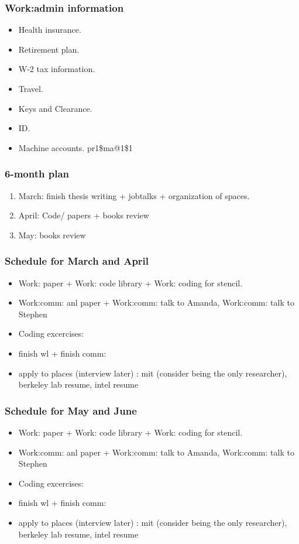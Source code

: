 \begin{frame} 
\frametitle{Work:admin information}

\begin{itemize} 
\item Health insurance.
\item Retirement plan.
\item W-2 tax information. 
\item Travel. 
\item Keys and Clearance. 
\item ID. 
\item Machine accounts. 
pr1\$ma@1\$1
\end{itemize} 
\end{frame} 



\begin{frame}
\frametitle{6-month plan}
\begin{enumerate}
\tiny \item \tiny March: finish thesis writing + jobtalks +
organization of spaces. 
\item \tiny April: Code/ papers + books review 
\item \tiny May: books review    
\end{enumerate}
\end{frame}

\begin{frame}[label=schedule2016]
\frametitle{Schedule for March and April}
\begin{itemize} 
\tiny \item \tiny Work: paper + Work: code library +  Work: coding for
stencil.  
\item \tiny Work:comm: anl paper + Work:comm: talk to Amanda, Work:comm: talk to Stephen 
\item \tiny Coding excercises: 
\item \tiny finish wl  + finish comm: 
\item \tiny apply to places (interview later) : mit (consider being
  the only researcher), berkeley lab resume, intel resume 
\end{itemize} 
\end{frame} 

\begin{frame}[label=schedule2016]
\frametitle{Schedule for May and June}
\begin{itemize} 
\tiny \item \tiny Work: paper + Work: code library +  Work: coding for
stencil.  
\item \tiny Work:comm: anl paper + Work:comm: talk to Amanda, Work:comm: talk to Stephen 
\item \tiny Coding excercises: 
\item \tiny finish wl  + finish comm: 
\item \tiny apply to places (interview later) : mit (consider being
  the only researcher), berkeley lab resume, intel resume 
\end{itemize} 
\end{frame}  

